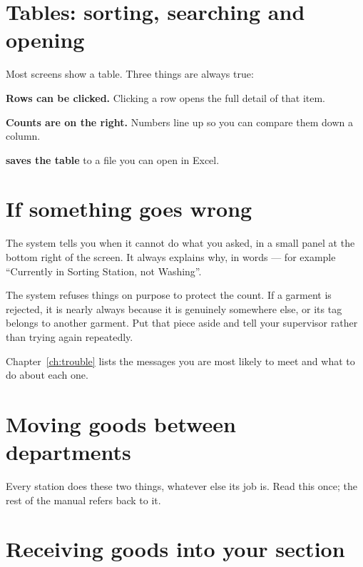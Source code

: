 \section{Tables: sorting, searching and opening}

Most screens show a table. Three things are always true:

\begin{bullets}
  \item \textbf{Rows can be clicked.} Clicking a row opens the full detail of that item.
  \item \textbf{Counts are on the right.} Numbers line up so you can compare them down a column.
  \item \textbf{ saves the table} to a file you can open in Excel.
\end{bullets}

\section{If something goes wrong}

The system tells you when it cannot do what you asked, in a small panel at the
bottom right of the screen. It always explains why, in words --- for example
``Currently in Sorting Station, not Washing''.

\begin{warnbox}
The system refuses things on purpose to protect the count. If a garment is
rejected, it is nearly always because it is genuinely somewhere else, or its tag
belongs to another garment. Put that piece aside and tell your supervisor rather
than trying again repeatedly.
\end{warnbox}

Chapter~\ref{ch:trouble} lists the messages you are most likely to meet and what
to do about each one.

\section{Moving goods between departments}

Every station does these two things, whatever else its job is. Read this once;
the rest of the manual refers back to it.

\section{Receiving goods into your section}
\label{sec:receive}

